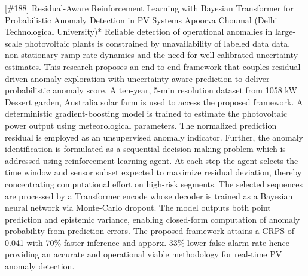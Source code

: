 {} \begin{abstract_online} {[\#188] Residual-Aware Reinforcement Learning with Bayesian Transformer for Probabilistic Anomaly Detection in PV Systems} {} {Apoorva Choumal (Delhi Technological University)*} {} Reliable detection of operational anomalies in large-scale photovoltaic plants is constrained by unavailability of labeled data data, non-stationary ramp-rate dynamics and the need for well-calibrated uncertainty estimates. This research proposes an end-to-end framework that couples residual-driven anomaly exploration with uncertainty-aware prediction to deliver probabilistic anomaly score. A ten-year, 5-min resolution dataset from 1058 kW Dessert garden, Australia solar farm is used to access the proposed framework. A deterministic gradient-boosting model is trained to estimate the photovoltaic power output using meteorological parameters. The  normalized prediction residual is employed as an unsupervised anomaly indicator. Further, the anomaly identification is formulated as a sequential decision-making problem which is addressed using reinforcement learning agent. At each step the agent selects the time window and sensor subset expected to maximize residual deviation, thereby concentrating computational effort on high-risk segments. The selected sequences are processed by a Transformer encode whose decoder is trained as a Bayesian neural network via Monte-Carlo dropout. The model outputs both point prediction and epistemic variance, enabling closed-form computation of anomaly probability from prediction errors. The proposed framework attains a CRPS of 0.041 with 70\% faster inference and apporx. 33\% lower false alarm rate hence providing an accurate and operational viable methodology for real-time PV anomaly detection.  \end{abstract_online} 
